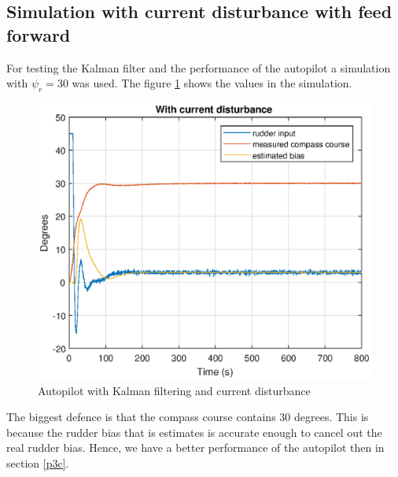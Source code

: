 \subsection{Simulation with current disturbance with feed forward}
For testing the Kalman filter and the performance of the autopilot a simulation with $\psi_r = 30$ was used. The figure \ref{fig:p5d} shows the values in the simulation. 
\newline
\begin{figure}[H]
    \centering
    \includegraphics[width=0.8\linewidth]{Part5_pics/ny_p5d.eps}
    \caption{Autopilot with Kalman filtering and current disturbance}
    \label{fig:p5d}
\end{figure}
The biggest defence is that the compass course contains 30 degrees. 
This is because the rudder bias that is estimates is accurate enough to cancel out the real rudder bias. Hence, we have a better performance of the autopilot then in section \ref{p3c}. 



